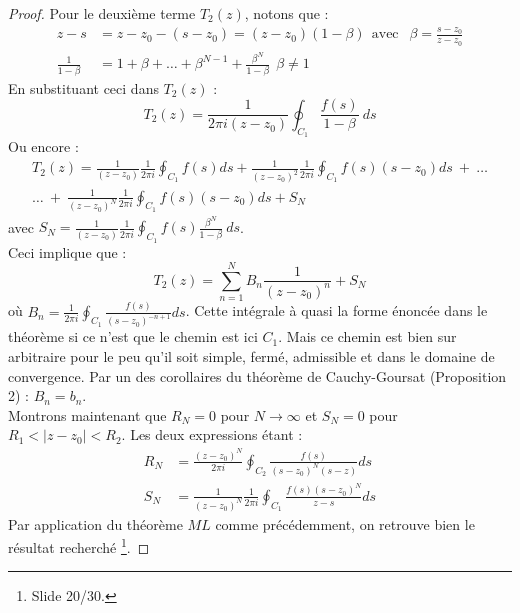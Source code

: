 \begin{proof}
	Pour le deuxième terme $T_2(z)$, notons que :
	\begin{equation}
	\begin{array}{ll}
	z-s &= z-z_0 - (s-z_0) = (z-z_0)(1-\beta)\ \ \text{avec }\ \ \beta = \frac{s-z_0}{z-z_0}\\
	\frac{1}{1-\beta} &= 1+\beta + \dots + \beta^{N-1} + \frac{\beta^N}{1-\beta}\ \ \beta \neq 1
	\end{array}
	\end{equation}
	En substituant ceci dans $T_2(z)$ :
	\begin{equation}
	T_2(z) =  \frac{1}{2\pi i(z-z_0)}\oint_{C_1} \frac{f(s)}{1-\beta}\ ds
	\end{equation}
	Ou encore :
	\begin{multline}
	T_2(z) = \frac{1}{(z-z_0)}\frac{1}{2\pi i}\oint_{C_1} f(s) ds + \frac{1}{(z-z_0)^2}\frac{1}{2\pi 
	i}\oint_{C_1} f(s)(s-z_0) ds\ +\ \dots \\
	 \dots\ +\ \frac{1}{(z-z_0)^N}\frac{1}{2\pi i}\oint_{C_1} f(s)(s-	z_0) ds + S_N
	\end{multline}
	avec $S_N = \frac{1}{(z-z_0)}\frac{1}{2\pi i}\oint_{C_1} f(s)\frac{\beta^N}{1-\beta}\ ds$.\\
	Ceci implique que :
	\begin{equation}
	T_2(z) = \sum_{n=1}^N B_n \frac{1}{(z-z_0)^n} + S_N
	\end{equation}
	où $B_n = \frac{1}{2\pi i}\oint_{C_1} \frac{f(s)}{(s-z_0)^{-n+1}} ds$. Cette intégrale à quasi
	la forme énoncée dans le théorème si ce n'est que le chemin est ici $C_1$. Mais ce chemin est
	bien sur arbitraire pour le peu qu'il soit simple, fermé, admissible et dans le domaine de 
	convergence. Par un des corollaires du théorème de Cauchy-Goursat (Proposition 2) : $B_n = 
	b_n$.\\
	
	Montrons maintenant que $R_N = 0$ pour $N \rightarrow \infty$ et $S_N = 0$ pour $R_1<|z-z_0|<
	R_2$. Les deux expressions étant : 
	\begin{equation}
	\begin{array}{ll}
	R_N &= \frac{(z-z_0)^N}{2\pi i}\oint_{C_2} \frac{f(s)}{(s-z_0)^N(s-z)}ds\\
	S_N &=	\frac{1}{(z-z_0)^N}\frac{1}{2\pi i}\oint_{C_1} \frac{f(s)(s-z_0)^N}{z-s}ds
	\end{array}
	\end{equation}
	Par application du théorème $ML$ comme précédemment, on retrouve bien le résultat recherché
	\footnote{Slide 20/30.}.
	\end{proof}

